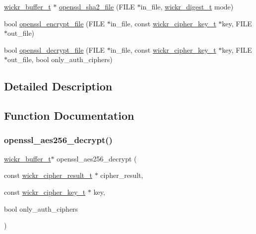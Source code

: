 \begin{DoxyCompactItemize}
\item 
\hyperlink{structwickr__buffer}{wickr\+\_\+buffer\+\_\+t} $\ast$ \hyperlink{group__openssl__crypto_ga12da75115315fbf7394f4791a2eb815c}{openssl\+\_\+sha2\+\_\+file} (F\+I\+LE $\ast$in\+\_\+file, \hyperlink{structwickr__digest}{wickr\+\_\+digest\+\_\+t} mode)
\item 
bool \hyperlink{group__openssl__crypto_ga178fa1f33ad2767c27411c3ebcdd3ca0}{openssl\+\_\+encrypt\+\_\+file} (F\+I\+LE $\ast$in\+\_\+file, const \hyperlink{structwickr__cipher__key}{wickr\+\_\+cipher\+\_\+key\+\_\+t} $\ast$key, F\+I\+LE $\ast$out\+\_\+file)
\item 
bool \hyperlink{group__openssl__crypto_gaf1faa509e06c188acfbdf43e2197c61a}{openssl\+\_\+decrypt\+\_\+file} (F\+I\+LE $\ast$in\+\_\+file, const \hyperlink{structwickr__cipher__key}{wickr\+\_\+cipher\+\_\+key\+\_\+t} $\ast$key, F\+I\+LE $\ast$out\+\_\+file, bool only\+\_\+auth\+\_\+ciphers)
\end{DoxyCompactItemize}


\subsection{Detailed Description}


\subsection{Function Documentation}
\mbox{\label{group__openssl__crypto_gac3650e924145a56ac236b6ce3e1bc9d9}} 
\subsubsection{\texorpdfstring{openssl\+\_\+aes256\+\_\+decrypt()}{openssl\_aes256\_decrypt()}}
{\footnotesize\ttfamily \hyperlink{structwickr__buffer}{wickr\+\_\+buffer\+\_\+t}$\ast$ openssl\+\_\+aes256\+\_\+decrypt (\begin{DoxyParamCaption}\item[{const \hyperlink{structwickr__cipher__result}{wickr\+\_\+cipher\+\_\+result\+\_\+t} $\ast$}]{cipher\+\_\+result,  }\item[{const \hyperlink{structwickr__cipher__key}{wickr\+\_\+cipher\+\_\+key\+\_\+t} $\ast$}]{key,  }\item[{bool}]{only\+\_\+auth\+\_\+ciphers }\end{DoxyParamCaption})}


